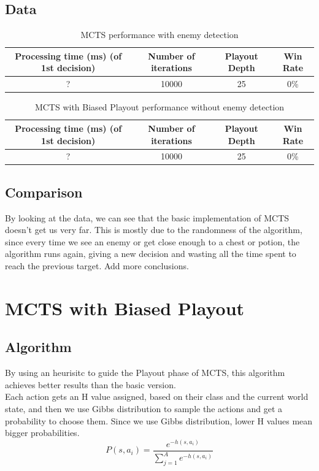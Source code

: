 \documentclass{article}
\begin{document}
  \subsection{Data}
  \begin{table}[h!]
    \centering
    \caption{MCTS performance with enemy detection}
    \label{tab:tableMCTS1}
    \begin{tabular}{c|c|c|c}
      \textbf{Processing time (ms) (of 1st decision)} & \textbf{Number of iterations} & \textbf{Playout Depth} & \textbf{Win Rate}\\
      \hline
      ? & 10000 & 25 & 0\%
    \end{tabular}
  \end{table}
  \begin{table}[h!]
    \centering
    \caption{MCTS with Biased Playout performance without enemy detection}
    \label{tab:tableMCTS2}
    \begin{tabular}{c|c|c|c}
      \textbf{Processing time (ms) (of 1st decision)} & \textbf{Number of iterations} & \textbf{Playout Depth} & \textbf{Win Rate}\\
      \hline
      ? & 10000 & 25 & 0\%
    \end{tabular}
  \end{table}

  \subsection{Comparison}
  By looking at the data, we can see that the basic implementation of MCTS doesn't get us very far. This is mostly due to the randomness of the algorithm, 
  since every time we see an enemy or get close enough to a chest or potion, the algorithm runs again, giving a new decision and wasting all 
  the time spent to reach the previous target.
  Add more conclusions.\\

  \section{MCTS with Biased Playout}
  \subsection{Algorithm}
  By using an heurisitc to guide the Playout phase of MCTS, this algorithm achieves better results than the basic version.\\
  Each action gets an H value assigned, based on their class and the current world state, and then we use Gibbs distribution to sample the actions and get a probability to choose them. 
  Since we use Gibbs distribution, lower H values mean bigger probabilities.\\
  \[P(s,a_i) = \frac{e^{-h(s, a_i)}}{\sum_{j=1}^{A}e^{-h(s, a_i)}}\]
  
\end{document}
